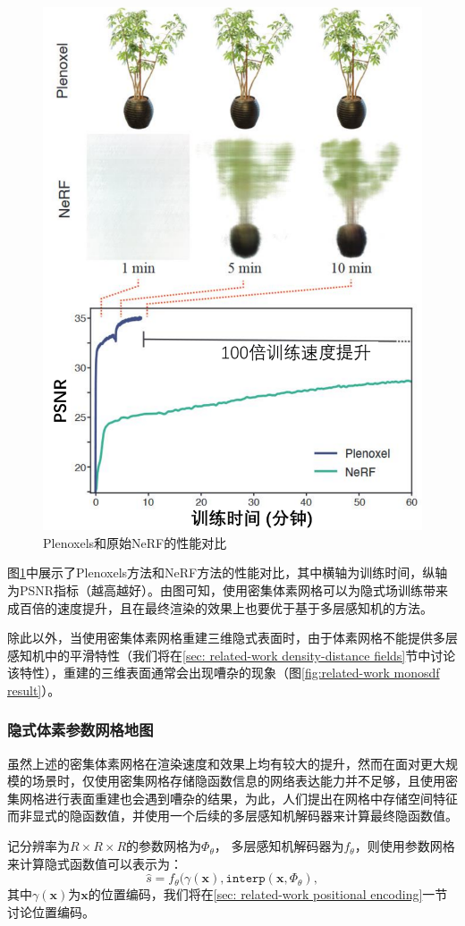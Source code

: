 \begin{figure}[h]
    \centering
    \includegraphics[width=.5\textwidth]{undergraduate-thesis/images/related-work/plenoxels-result.pdf}
    \caption{Plenoxels和原始NeRF的性能对比}
    \label{fig:related-work plenoxels-result}
\end{figure}

图\ref{fig:related-work plenoxels-result}中展示了Plenoxels方法和NeRF方法的性能对比，其中横轴为训练时间，纵轴为PSNR指标（越高越好）。由图可知，使用密集体素网格可以为隐式场训练带来成百倍的速度提升，且在最终渲染的效果上也要优于基于多层感知机的方法。

除此以外，当使用密集体素网格重建三维隐式表面时，由于体素网格不能提供多层感知机中的平滑特性（我们将在\ref{sec: related-work density-distance fields}节中讨论该特性），重建的三维表面通常会出现嘈杂的现象（图\ref{fig:related-work monosdf result}）。

\subsubsection{隐式体素参数网格地图}
虽然上述的密集体素网格在渲染速度和效果上均有较大的提升，然而在面对更大规模的场景时，仅使用密集网格存储隐函数信息的网络表达能力并不足够，且使用密集网格进行表面重建也会遇到嘈杂的结果，为此，人们提出在网格中存储空间特征而非显式的隐函数值\cite{liu_neural_2021, takikawa_neural_2021, yu_monosdf_2022, huang_di-fusion_2021, peng_convolutional_2020}，并使用一个后续的多层感知机解码器来计算最终隐函数值。

记分辨率为$R\times R\times R$的参数网格为$\Phi_\theta$， 多层感知机解码器为$f_\theta$，则使用参数网格来计算隐式函数值可以表示为：
\begin{equation}
    \hat{s} = f_\theta(\gamma(\mathbf{x}), \mathtt{interp}(\mathbf{x}, \Phi_\theta),
\end{equation}
其中$\gamma(\mathbf{x})$为$\mathbf{x}$的位置编码，我们将在\ref{sec: related-work positional encoding}一节讨论位置编码。

